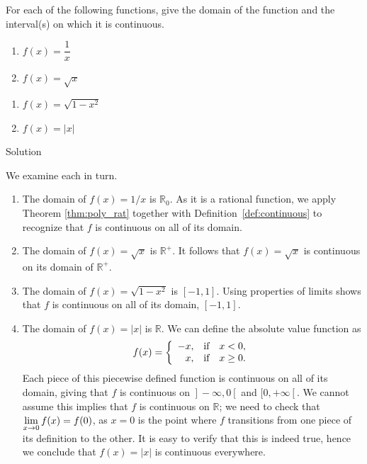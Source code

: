 \begin{example}\label{ex_cont_funct1}
For each of the following functions, give the domain of the function and the interval(s) on which it is continuous.

\noindent%
\noindent\begin{minipage}[t]{.5\textwidth}
			\begin{enumerate}
				\item		$f(x) = \dfrac{1}{x}$
				\item		$f(x) = \sqrt{x}$
			\end{enumerate}
			\end{minipage}
\begin{minipage}[t]{.5\textwidth}
			\begin{enumerate}\addtocounter{enumi}{2}
				\item		$f(x) = \sqrt{1-x^2}$
				\ifcourse \item		$f(x) = |x|$     \fi
			\end{enumerate}
\end{minipage}

Solution 

We examine each in turn.	
		\begin{enumerate}
			\item		The domain of $f(x) = 1/x$ is $\mathbb{R}_0$. As it is a rational function, we apply Theorem \ref{thm:poly_rat} together with Definition~\ref{def:continuous} to recognize that $f$ is continuous on all of its domain.
			\item		The domain of $f(x) = \sqrt{x}$ is $\mathbb{R}^+$. It follows that $f(x) = \sqrt{x}$ is continuous on its domain of $\mathbb{R}^+$.
			\item		The domain of $f(x) = \sqrt{1-x^2}$ is $[-1,1]$. Using properties of limits shows that $f$ is continuous on all of its domain, $[-1,1]$.
			\ifcourse \item		The domain of $f(x) = |x|$ is $\mathbb{R}$. We can define the absolute value function as $$\displaystyle f(x) = \left\{\begin{array}{rcl} -x, & \mbox{if} &  x<0, \\ x, & \mbox{if} &  x\geq 0. \end{array}\right.$$ 
			Each piece of this piecewise defined function is continuous on all of its domain, giving that $f$ is continuous on $\left.\right]-\infty,0\left[\right.$ and $[0,+\infty\left[\right.$. We cannot assume this implies that $f$ is continuous on $\mathbb{R}$; we need to check that $\displaystyle \lim_{x\to 0}f(x) = f(0)$, as $x=0$ is the point where $f$ transitions from one piece of its definition to the other. It is easy to verify that this is indeed true, hence we conclude that $f(x) = |x|$ is continuous everywhere.\fi
		\end{enumerate}
		\end{example}
		
